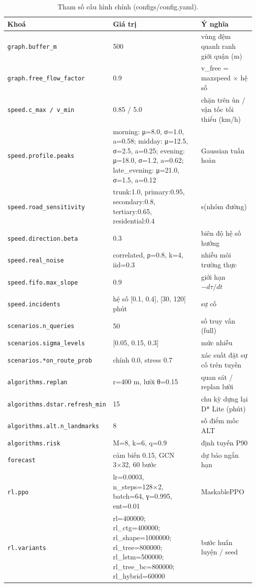 \begin{table}[!htbp]
\centering
\footnotesize
\caption{Tham số cấu hình chính (configs/config.yaml).}
\label{tab:tab_config}
\begin{tabularx}{\linewidth}{lXl}
\toprule
Khoá & Giá trị & Ý nghĩa \\
\midrule
\texttt{graph.buffer\_m} & 500 & vùng đệm quanh ranh giới quận (m) \\
\texttt{graph.free\_flow\_factor} & 0.9 & v\_free = maxspeed × hệ số \\
\texttt{speed.c\_max / v\_min} & 0.85 / 5.0 & chặn trên ùn / vận tốc tối thiểu (km/h) \\
\texttt{speed.profile.peaks} & morning: μ=8.0, σ=1.0, a=0.58; midday: μ=12.5, σ=2.5, a=0.25; evening: μ=18.0, σ=1.2, a=0.62; late\_evening: μ=21.0, σ=1.5, a=0.12 & Gaussian tuần hoàn \\
\texttt{speed.road\_sensitivity} & trunk:1.0, primary:0.95, secondary:0.8, tertiary:0.65, residential:0.4 & s(nhóm đường) \\
\texttt{speed.direction.beta} & 0.3 & biên độ hệ số hướng \\
\texttt{speed.real\_noise} & correlated, ρ=0.8, k=4, iid=0.3 & nhiễu môi trường thực \\
\texttt{speed.fifo.max\_slope} & 0.9 & giới hạn $-d\tau/dt$ \\
\texttt{speed.incidents} & hệ số [0.1, 0.4], [30, 120] phút & sự cố \\
\texttt{scenarios.n\_queries} & 50 & số truy vấn (full) \\
\texttt{scenarios.sigma\_levels} & [0.05, 0.15, 0.3] & mức nhiễu \\
\texttt{scenarios.*on\_route\_prob} & chính 0.0, stress 0.7 & xác suất đặt sự cố trên tuyến \\
\texttt{algorithms.replan} & r=400 m, lười θ=0.15 & quan sát / replan lười \\
\texttt{algorithms.dstar.refresh\_min} & 15 & chu kỳ dựng lại D* Lite (phút) \\
\texttt{algorithms.alt.n\_landmarks} & 8 & số điểm mốc ALT \\
\texttt{algorithms.risk} & M=8, k=6, q=0.9 & định tuyến P90 \\
\texttt{forecast} & cảm biến 0.15, GCN 3×32, 60 bước & dự báo ngắn hạn \\
\texttt{rl.ppo} & lr=0.0003, n\_steps=128×2, batch=64, γ=0.995, ent=0.01 & MaskablePPO \\
\texttt{rl.variants} & rl=400000; rl\_ctg=400000; rl\_shape=1000000; rl\_tree=800000; rl\_lstm=500000; rl\_tree\_bc=800000; rl\_hybrid=60000 & bước huấn luyện / seed \\

\end{tabularx}
\end{table}
